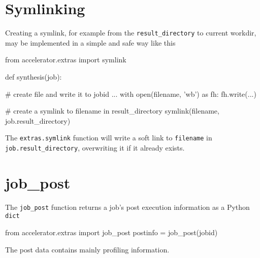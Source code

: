 




\section{Symlinking}
\label{sec:symlinking}
Creating a symlink, for example from the \texttt{result\_directory} to
current workdir, may be implemented in a simple and safe way like this
\begin{python}
from accelerator.extras import symlink

def synthesis(job):

    # create file and write it to jobid
    ...
    with open(filename, 'wb') as fh:
        fh.write(...)

    # create a symlink to filename in result_directory
    symlink(filename, job.result_directory)
\end{python}
The \texttt{extras.symlink} function will write a soft link
to \texttt{filename} in \texttt{job.result\_directory}, overwriting it if
it already exists.



\section{job\_post}
The \texttt{job\_post} function returns a job's post execution
information as a Python \texttt{dict}
\begin{python}
from accelerator.extras import job_post
postinfo = job_post(jobid)
\end{python}
The post data contains mainly profiling information.



